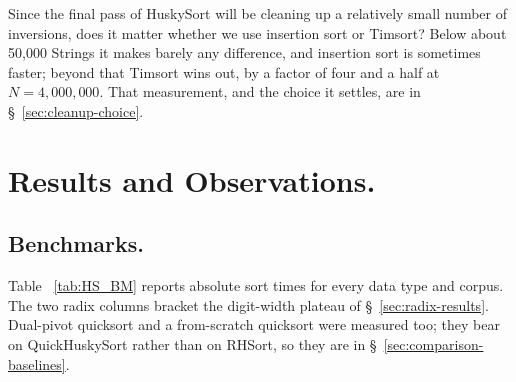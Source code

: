 \documentclass[twoside,leqno,twocolumn]{article}
\begin{document}
Since the final pass of HuskySort will be cleaning up a relatively small number of inversions, does it
matter whether we use insertion sort or Timsort?
Below about 50,000 Strings it makes barely any difference, and insertion sort is sometimes faster;
beyond that Timsort wins out, by a factor of four and a half at $N = 4{,}000{,}000$.
That measurement, and the choice it settles, are in \S~\ref{sec:cleanup-choice}.


\section{Results and Observations.}
\subsection{Benchmarks.}

Table ~\ref{tab:HS_BM} reports absolute sort times for every data type and corpus.
The two radix columns bracket the digit-width plateau of \S~\ref{sec:radix-results}.
Dual-pivot quicksort and a from-scratch quicksort were measured too; they bear on QuickHuskySort
rather than on RHSort, so they are in \S~\ref{sec:comparison-baselines}.
\end{document}
